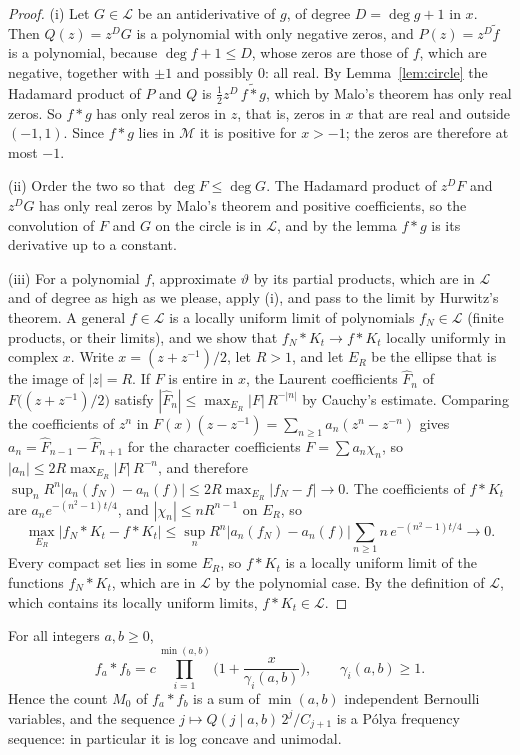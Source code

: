 \begin{proof}
(i) Let $G\in\mathcal L$ be an antiderivative of $g$, of degree $D=\deg g+1$ in $x$. Then $Q(z)=z^DG$ is a polynomial with only negative zeros, and $P(z)=z^D\tilde f$ is a polynomial, because $\deg f+1\le D$, whose zeros are those of $f$, which are negative, together with $\pm1$ and possibly $0$: all real. By Lemma~\ref{lem:circle} the Hadamard product of $P$ and $Q$ is $\frac12z^D\,\widetilde{f*g}$, which by Malo's theorem has only real zeros. So $f*g$ has only real zeros in $z$, that is, zeros in $x$ that are real and outside $(-1,1)$. Since $f*g$ lies in $\mathcal M$ it is positive for $x>-1$; the zeros are therefore at most $-1$.

(ii) Order the two so that $\deg F\le\deg G$. The Hadamard product of $z^DF$ and $z^DG$ has only real zeros by Malo's theorem and positive coefficients, so the convolution of $F$ and $G$ on the circle is in $\mathcal L$, and by the lemma $f*g$ is its derivative up to a constant.

(iii) For a polynomial $f$, approximate $\vartheta$ by its partial products, which are in $\mathcal L$ and of degree as high as we please, apply (i), and pass to the limit by Hurwitz's theorem. A general $f\in\mathcal L$ is a locally uniform limit of polynomials $f_N\in\mathcal L$ (finite products, or their limits), and we show that $f_N*K_t\to f*K_t$ locally uniformly in complex $x$. Write $x=(z+z^{-1})/2$, let $R>1$, and let $E_R$ be the ellipse that is the image of $|z|=R$. If $F$ is entire in $x$, the Laurent coefficients $\hat F_n$ of $F\big((z+z^{-1})/2\big)$ satisfy $|\hat F_n|\le\max_{E_R}|F|\,R^{-|n|}$ by Cauchy's estimate. Comparing the coefficients of $z^n$ in $F(x)(z-z^{-1})=\sum_{n\ge1}a_n(z^n-z^{-n})$ gives $a_n=\hat F_{n-1}-\hat F_{n+1}$ for the character coefficients $F=\sum a_n\chi_n$, so $|a_n|\le2R\max_{E_R}|F|\,R^{-n}$, and therefore $\sup_nR^n|a_n(f_N)-a_n(f)|\le2R\max_{E_R}|f_N-f|\to0$. The coefficients of $f*K_t$ are $a_ne^{-(n^2-1)t/4}$, and $|\chi_n|\le nR^{n-1}$ on $E_R$, so
\[
\max_{E_R}|f_N*K_t-f*K_t|\le\sup_nR^n|a_n(f_N)-a_n(f)|\sum_{n\ge1}n\,e^{-(n^2-1)t/4}\to0 .
\]
Every compact set lies in some $E_R$, so $f*K_t$ is a locally uniform limit of the functions $f_N*K_t$, which are in $\mathcal L$ by the polynomial case. By the definition of $\mathcal L$, which contains its locally uniform limits, $f*K_t\in\mathcal L$.
\end{proof}

\begin{corollary}\label{cor:coalzeros}
For all integers $a,b\ge0$,
\[
f_a*f_b=c\prod_{i=1}^{\min(a,b)}\Big(1+\frac{x}{\gamma_i(a,b)}\Big),\qquad\gamma_i(a,b)\ge1 .
\]
Hence the count $M_0$ of $f_a*f_b$ is a sum of $\min(a,b)$ independent Bernoulli variables, and the sequence $j\mapsto Q(j\mid a,b)\,2^j/C_{j+1}$ is a P\'olya frequency sequence: in particular it is log concave and unimodal.
\end{corollary}


